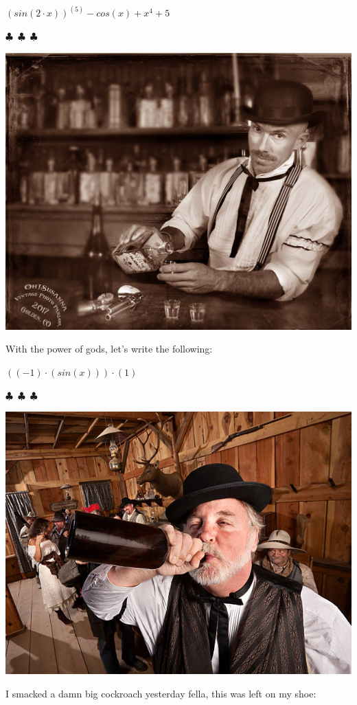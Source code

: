 \documentclass{article}
\begin{document}
\begin{center}$
{{{{{({sin{({{2}\cdot{x}})}})}^{({5})}}-{cos{({x})}}}+{x^4}}+{5}}
$\end{center}
\begin{center} $\clubsuit$~$\clubsuit$~$\clubsuit$ \end{center}\begin{center}  \includegraphics[scale=0.3]{funny_pics/bartender.jpg} \end{center} With the power of gods, let's write the following: 
\begin{center}$
{{({{({-1})}\cdot{({sin{({x})}})}})}\cdot{({1})}}
$\end{center}
\begin{center} $\clubsuit$~$\clubsuit$~$\clubsuit$ \end{center}\begin{center}  \includegraphics[scale=1.4]{funny_pics/drunk_cowboy.jpg} \end{center} I smacked a damn big cockroach yesterday fella, this was left on my shoe: 
\end{document}
